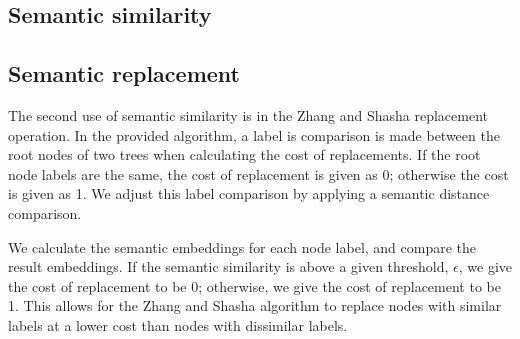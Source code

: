 



\subsection{Semantic similarity}








\subsection{Semantic replacement}

The second use of semantic similarity is in the Zhang and Shasha replacement operation. In the provided algorithm, a label is comparison is made between the root nodes of two trees when calculating the cost of replacements. If the root node labels are the same, the cost of replacement is given as 0; otherwise the cost is given as 1. We adjust this label comparison by applying a semantic distance comparison.

We calculate the semantic embeddings for each node label, and compare the result embeddings. If the semantic similarity is above a given threshold, $\epsilon$, we give the cost of replacement to be 0; otherwise, we give the cost of replacement to be 1. This allows for the Zhang and Shasha algorithm to replace nodes with similar labels at a lower cost than nodes with dissimilar labels.

